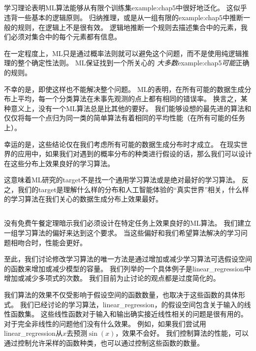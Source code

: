 \subsection{}
\label{sec:the_no_free_lunch_theorem}
学习理论表明\gls{ML}算法能够从有限个训练集\gls{example:chap5}中很好地泛化。
这似乎违背一些基本的逻辑原则。
归纳推理，或是从一组有限的\gls{example:chap5}中推断一般的规则，在逻辑上不是很有效。
逻辑地推断一个规则去描述集合中的元素，我们必须对集合中的每个元素都有信息。

在一定程度上，\gls{ML}只是通过概率法则就可以避免这个问题，而不是使用纯逻辑推理的整个确定性法则。
\gls{ML}保证找到一个所关心的 \emph{大多数}\gls{example:chap5}\emph{可能}正确的规则。

不幸的是，即使这样也不能解决整个问题。
\gls{ML}的表明，在所有可能的数据生成分布上平均，每一个分类算法在未事先观测的点上都有相同的错误率。
换言之，某种意义上，没有一个\gls{ML}算法总是比其他的要好。
我们能够设想的最先进的算法和仅仅将每一个点归为同一类的简单算法有着相同的平均性能（在所有可能的任务上）。


幸运的是，这些结论仅在我们考虑所有可能的数据生成分布时才成立。
在现实世界的应用中，如果我们对遇到的概率分布的种类进行假设的话，那么我们可以设计在这些分布上效果良好的学习算法。

这意味着\gls{ML}研究的\gls{target}不是找一个通用学习算法或是绝对最好的学习算法。
反之，我们的\gls{target}是理解什么样的分布和人工智能体验的“真实世界”相关，什么样的学习算法在我们关心的数据生成分布上效果最好。

\subsection{}
\label{sec:regularization}
没有免费午餐定理暗示我们必须设计在特定任务上效果良好的\gls{ML}算法。
我们建立一组学习算法的偏好来达到这个要求。
当这些偏好和我们希望算法解决的学习问题相吻合时，性能会更好。

至此，我们讨论修改学习算法的唯一方法是通过增加或减少学习算法可选假设空间的函数来增加或减少模型的容量。
我们列举的一个具体例子是\gls{linear_regression}中增加或减少多项式的次数。
我们目前为止讨论的观点都是过度简化的。

我们算法的效果不仅受影响于假设空间的函数数量，也取决于这些函数的具体形式。
我们已经讨论的学习算法，\gls{linear_regression}，的假设空间包含关于输入的线性函数集。
这些线性函数对于输入和输出确实接近线性相关的问题是很有用的。
对于完全非线性的问题他们没有什么效果。
例如，如果我们尝试用\gls{linear_regression}从$x$去预测$\sin(x)$，效果不会好。
我们控制算法的性能，可以通过控制允许采样的函数种类，也可以通过控制这些函数的数量。

